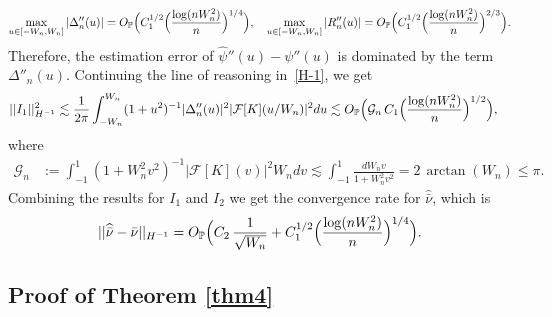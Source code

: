 \documentclass[numbers,webpdf,imaiai]{ima-authoring-template}%
\theoremstyle{thmstyletwo}%
\newcommand{\F}{\mathcal{F}}
\newcommand{\mG}{\mathcal{G}}
\numberwithin{equation}{section}
\begin{document}
\begin{enumerate}
\begin{equation*}
        \max_{u \in [-W_n, W_n]}|\Delta''_n (u)| = O_{\mathbb{P}}\Bigl(C_1^{1/2}\Bigl(\frac{\log(nW^2_n)}{n}\Bigr)^{1/4}\Bigr), \quad     \max_{u \in [-W_n, W_n]}|R''_n(u)| = O_{\mathbb{P}}\Bigl(C_1^{1/2}\Bigl(\frac{\log(nW^2_n)}{n}\Bigr)^{2/3}\Bigr).
\end{equation*}
Therefore, the estimation error of $\widehat{\psi}''(u) - \psi''(u)$ is dominated by the term $\Delta''_n(u) $. Continuing the line of reasoning in~\eqref{H-1}, we get 
    \begin{align*}    ||I_1||^2_{H^{-1}}
    &\lesssim \frac{1}{2\pi} \int_{-W_n}^{W_n} (1 + u^2)^{-1} |\Delta_n''(u) |^2 |\F[K](u/W_n)|^2 du 
    \lesssim O_{\mathbb{P}}\Bigl(\mG_n\, C_1\Bigl(\frac{\log(nW^2_n)}{n}\Bigr)^{1/2}\Bigr) ,
    \end{align*}
    where 
    \begin{align*} 
    \mG_n &:=   \int_{-1}^{1} (1 + W_n^2v^2)^{-1} |\F[K](v)|^2 W_n dv  \lesssim  \int_{-1}^{1} \frac{d W_n v}{1 + W_n^2v^2} = 2\,\arctan(W_n) \leq \pi.
\end{align*}
Combining the results for $I_1$ and $I_2$ we get the convergence rate for $\widehat{\bar{\nu}}$, which is
\begin{equation*}
    ||\widehat{\bar{\nu}} - \bar{\nu}||_{H^{-1}} = O_{\mathbb{P}}\Bigl(C_2\,\frac{1}{\sqrt{W_n}} + C_1^{1/2}\Bigl(\frac{\log (nW^2_n)}{n}\Bigr)^{1/4}\Bigr).
\end{equation*}
\end{enumerate}

\subsection{Proof of Theorem \ref{thm4}}
\end{document}
